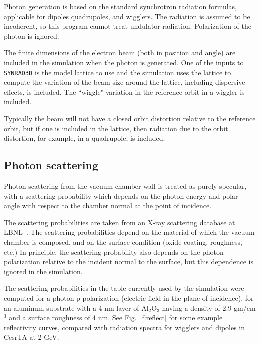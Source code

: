 \documentclass[11pt]{article}
\newcommand{\srthree}{\texttt{SYNRAD3D}\xspace}
\begin{document}
Photon generation is based on the standard synchrotron radiation
formulas, applicable for dipoles quadrupoles, and wigglers. The
radiation is assumed to be incoherent, so this program cannot treat
undulator radiation. Polarization of the photon is ignored.

The finite dimensions of the electron beam (both in position and
angle) are included in the simulation when the photon is
generated. One of the inputs to \srthree is the model lattice
to use and the simulation uses the lattice to compute the
variation of the beam size around the lattice, including dispersive
effects, is included. The ``wiggle" variation in the reference orbit
in a wiggler is included.

Typically the beam will not have a closed orbit distortion relative to
the reference orbit, but if one is included in the lattice, then
radiation due to the orbit distortion, for example, in a quadrupole,
is included.  

\subsection{Photon scattering} 

Photon scattering from the vacuum chamber wall is treated as purely
specular, with a scattering probability which depends on the photon
energy and polar angle with respect to the chamber normal at the point
of incidence.

The scattering probabilities are taken from an X-ray scattering
database at LBNL~\cite{b.henke}. The scattering probabilities depend on
the material of which the vacuum chamber is composed, and on the
surface condition (oxide coating, roughness, etc.) In principle, the
scattering probability also depends on the photon polarization
relative to the incident normal to the surface, but this dependence is
ignored in the simulation.

The scattering probabilities in the table currently used by the
simulation were computed for a photon p-polarization (electric field
in the plane of incidence), for an aluminum substrate with a 4 nm
layer of Al$_2$O$_3$ having a density of 2.9 gm/cm$^3$ and a surface
roughness of 4 nm. See Fig.~\ref{f:reflect} for some example
reflectivity curves, compared with radiation spectra for wigglers and
dipoles in CesrTA at 2 GeV.
\end{document}
